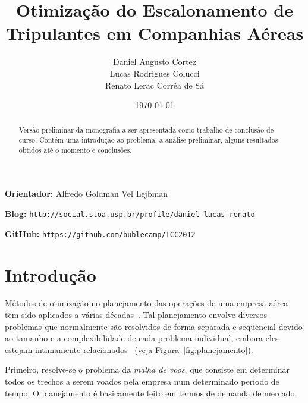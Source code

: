 \documentclass[12pt,a4paper]{article}
\newcommand{\zerar}{\setcounter{equation}{0}\setcounter{figure}{0}\setcounter{table}{0}}
\begin{document}
\title{\bf Otimização do Escalonamento de Tripulantes em Companhias Aéreas}
\author{Daniel Augusto Cortez \\ Lucas Rodrigues Colucci \\ Renato Lerac Corrêa de Sá}
\date{\today}

\maketitle

\begin{abstract}
	Versão preliminar da monografia a ser apresentada como trabalho de conclusão de curso. Contém
	uma introdução ao problema, a análise preliminar, alguns resultados obtidos até o momento e 
	conclusões.
\end{abstract}

\vspace{1cm}

\begin{center}
	{\bf Orientador:} Alfredo Goldman Vel Lejbman

	\vspace{1.5cm}

	{\bf Blog:} \verb|http://social.stoa.usp.br/profile/daniel-lucas-renato|

	{\bf GitHub:} \verb|https://github.com/bublecamp/TCC2012| 
\end{center}

\thispagestyle{empty}

\newpage 

\tableofcontents

\newpage


\zerar
\section{Introdução}
\label{sec:introducao}

Métodos de otimização no planejamento das operações de uma empresa aérea têm sido aplicados a várias
décadas~\cite{yu}. Tal planejamento envolve diversos problemas que normalmente são resolvidos de
forma separada e seqüencial devido ao tamanho e a complexibilidade de cada problema individual,
embora eles estejam intimamente relacionados~\cite{barnhart03} (veja Figura~\ref{fig:planejamento}).

Primeiro, resolve-se o problema da \emph{malha de voos}, que consiste em determinar todos os trechos
a serem voados pela empresa num determinado período de tempo. O planejamento é basicamente feito em
termos de demanda de mercado.
\end{document}
